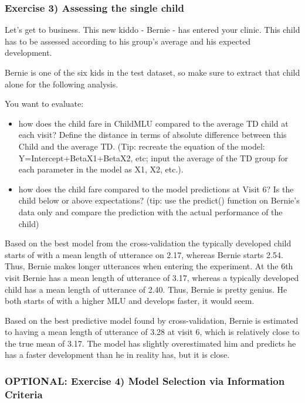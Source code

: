 \documentclass[]{article}
\begin{document}
\subsubsection{Exercise 3) Assessing the single
child}\label{exercise-3-assessing-the-single-child}

Let's get to business. This new kiddo - Bernie - has entered your
clinic. This child has to be assessed according to his group's average
and his expected development.

Bernie is one of the six kids in the test dataset, so make sure to
extract that child alone for the following analysis.

You want to evaluate:

\begin{itemize}
\item
  how does the child fare in ChildMLU compared to the average TD child
  at each visit? Define the distance in terms of absolute difference
  between this Child and the average TD. (Tip: recreate the equation of
  the model: Y=Intercept+BetaX1+BetaX2, etc; input the average of the TD
  group for each parameter in the model as X1, X2, etc.).
\item
  how does the child fare compared to the model predictions at Visit 6?
  Is the child below or above expectations? (tip: use the predict()
  function on Bernie's data only and compare the prediction with the
  actual performance of the child)
\end{itemize}

Based on the best model from the cross-validation the typically
developed child starts of with a mean length of utterance on 2.17,
whereas Bernie starts 2.54. Thus, Bernie makes longer utterances when
entering the experiment. At the 6th visit Bernie has a mean length of
utterance of 3.17, whereas a typically developed child has a mean length
of utterance of 2.40. Thus, Bernie is pretty genius. He both starts of
with a higher MLU and develops faster, it would seem.

Based on the best predictive model found by cross-validation, Bernie is
estimated to having a mean length of utterance of 3.28 at visit 6, which
is relatively close to the true mean of 3.17. The model has slightly
overestimated him and predicts he has a faster development than he in
reality has, but it is close.

\subsubsection{OPTIONAL: Exercise 4) Model Selection via Information
Criteria}\label{optional-exercise-4-model-selection-via-information-criteria}
\end{document}
